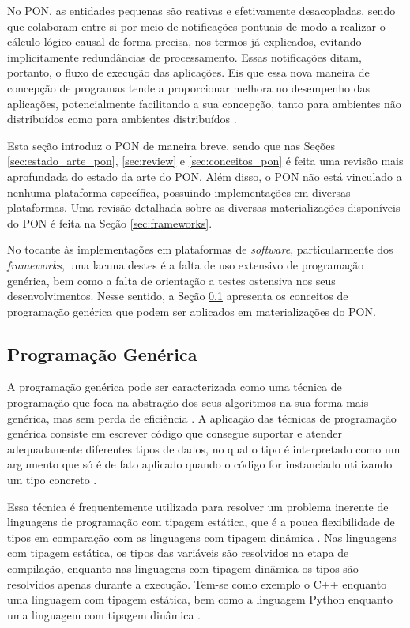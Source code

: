 No PON, as entidades pequenas são reativas e efetivamente desacopladas, sendo
que colaboram entre si por meio de notificações pontuais de modo a realizar o
cálculo lógico-causal de forma precisa, nos termos já explicados, evitando
implicitamente redundâncias de processamento. Essas notificações ditam,
portanto, o fluxo de execução das aplicações. Eis que essa nova maneira de
concepção de programas tende a proporcionar melhora no desempenho das
aplicações, potencialmente facilitando a sua concepção, tanto para ambientes não
distribuídos como para ambientes distribuídos
\cite{pat_simao_2008,simao_2009,simao_2012a}.

Esta seção introduz o PON de maneira breve, sendo que nas Seções
\ref{sec:estado_arte_pon}, \ref{sec:review} e \ref{sec:conceitos_pon} é feita
uma revisão mais aprofundada do estado da arte do PON. Além disso, o PON não
está vinculado a nenhuma plataforma específica, possuindo implementações em
diversas plataformas. Uma revisão detalhada sobre as diversas materializações
disponíveis do PON é feita na Seção \ref{sec:frameworks}.

No tocante às implementações em plataformas de \textit{software},
particularmente dos \textit{frameworks}, uma lacuna destes é a falta de uso
extensivo de programação genérica, bem como a falta de orientação a testes
ostensiva nos seus desenvolvimentos. Nesse sentido, a Seção \ref{sec:generic}
apresenta os conceitos de programação genérica que podem ser aplicados em
materializações do PON.

\subsection{Programação Genérica}\label{sec:generic}

A programação genérica pode ser caracterizada como uma técnica de programação
que foca na abstração dos seus algoritmos na sua forma mais genérica, mas sem
perda de eficiência \cite{stepanov_2015}. A aplicação das técnicas de
programação genérica consiste em escrever código que consegue suportar e atender
adequadamente diferentes tipos de dados, no qual o tipo é interpretado como um
argumento que só é de fato aplicado quando o código for instanciado utilizando
um tipo concreto \cite{stepanov_1998}.

Essa técnica é frequentemente utilizada para resolver um problema inerente de
linguagens de programação com tipagem estática, que é a pouca flexibilidade de
tipos em comparação com as linguagens com tipagem dinâmica \cite{cardelli_1985}.
Nas linguagens com tipagem estática, os tipos das variáveis são resolvidos na
etapa de compilação, enquanto nas linguagens com tipagem dinâmica os tipos são
resolvidos apenas durante a execução. Tem-se como exemplo o C++ enquanto uma
linguagem com tipagem estática, bem como a linguagem Python enquanto uma
linguagem com tipagem dinâmica \cite{hurd_2021}.

